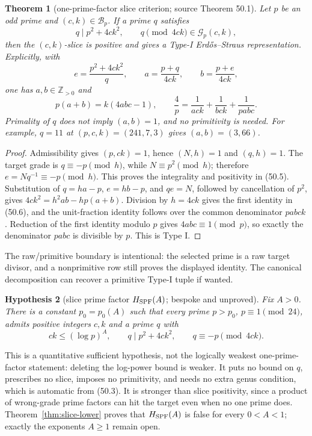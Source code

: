 \documentclass[10pt,reqno]{amsart}
\newtheorem{theorem}{Theorem}[section]
\newtheorem{hypothesis}[theorem]{Hypothesis}
\theoremstyle{definition}
\newcommand{\1}{\mathbf 1}
\begin{document}
\begin{theorem}[one-prime-factor slice criterion; source Theorem 50.1]
\label{thm:one-prime-slice}
Let $p$ be an odd prime and $(c,k)\in\mathcal B_p$.  If a prime $q$
satisfies
\begin{equation}\tag{50.4}
 q\mid p^2+4ck^2,
 \qquad q\pmod {4ck}\in\mathcal G_p(c,k),
\end{equation}
then the $(c,k)$-slice is positive and gives a Type-I Erd\H{o}s--Straus
representation.  Explicitly, with
\begin{equation}\tag{50.5}
 e=\frac{p^2+4ck^2}{q},\qquad
 a=\frac{p+q}{4ck},\qquad b=\frac{p+e}{4ck},
\end{equation}
one has $a,b\in\mathbb Z_{>0}$ and
\begin{equation}\tag{50.6}
 p(a+b)=k(4abc-1),\qquad
 \frac4p=\frac1{ack}+\frac1{bck}+\frac1{pabc}.
\end{equation}
Primality of $q$ does not imply $(a,b)=1$, and no primitivity is needed.
For example, $q=11$ at $(p,c,k)=(241,7,3)$ gives $(a,b)=(3,66)$.
\end{theorem}
\begin{proof}
Admissibility gives $(p,ck)=1$, hence $(N,h)=1$ and $(q,h)=1$.  The target
grade is $q\equiv-p\pmod h$, while $N\equiv p^2\pmod h$; therefore
$e=Nq^{-1}\equiv-p\pmod h$.  This proves the integrality and positivity
in (50.5).  Substitution of $q=ha-p$, $e=hb-p$, and $qe=N$, followed by
cancellation of $p^2$, gives $4ck^2=h^2ab-hp(a+b)$.  Division by
$h=4ck$ gives the first identity in (50.6), and the unit-fraction identity
follows over the common denominator $pabck$.  Reduction of the first
identity modulo $p$ gives $4abc\equiv1\pmod p$, so exactly the denominator
$pabc$ is divisible by $p$.  This is Type I.
\end{proof}
The raw/primitive boundary is intentional: the selected prime is a raw
target divisor, and a nonprimitive row still proves the displayed identity.
The canonical decomposition can recover a primitive Type-I tuple if wanted.

\begin{hypothesis}[slice prime factor $H_{\rm SPF}(A)$; bespoke and unproved]
\label{hyp:SPF}
Fix $A>0$.  There is a constant $p_0=p_0(A)$ such that every prime
$p>p_0$, $p\equiv1\pmod {24}$, admits positive integers $c,k$ and a prime
$q$ with
\begin{equation}\tag{50.7}
 \boxed{\quad ck\leq(\log p)^A,\qquad
 q\mid p^2+4ck^2,\qquad q\equiv-p\pmod {4ck}.\quad}
\end{equation}
\end{hypothesis}
This is a quantitative sufficient hypothesis, not the logically weakest
one-prime-factor statement: deleting the log-power bound is weaker.  It
puts no bound on $q$, prescribes no slice, imposes no primitivity, and needs
no extra genus condition, which is automatic from (50.3).  It is stronger
than slice positivity, since a product of wrong-grade prime factors can hit
the target even when no one prime does.  Theorem~\ref{thm:slice-lower}
proves that $H_{\rm SPF}(A)$ is false for every $0<A<1$; exactly the
exponents $A\geq1$ remain open.
\end{document}
